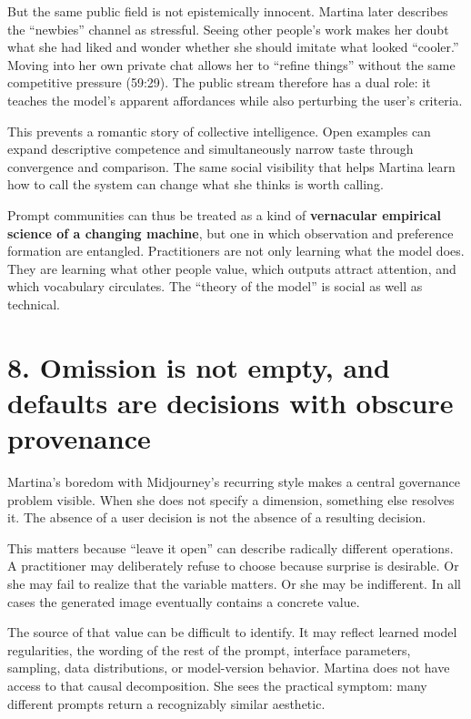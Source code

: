 \documentclass[
  11pt,
  letterpaper,
]{article}
\begin{document}
But the same public field is not epistemically innocent. Martina later
describes the ``newbies'' channel as stressful. Seeing other people's
work makes her doubt what she had liked and wonder whether she should
imitate what looked ``cooler.'' Moving into her own private chat allows
her to ``refine things'' without the same competitive pressure (59:29).
The public stream therefore has a dual role: it teaches the model's
apparent affordances while also perturbing the user's criteria.

This prevents a romantic story of collective intelligence. Open examples
can expand descriptive competence and simultaneously narrow taste
through convergence and comparison. The same social visibility that
helps Martina learn how to call the system can change what she thinks is
worth calling.

Prompt communities can thus be treated as a kind of \textbf{vernacular
empirical science of a changing machine}, but one in which observation
and preference formation are entangled. Practitioners are not only
learning what the model does. They are learning what other people value,
which outputs attract attention, and which vocabulary circulates. The
``theory of the model'' is social as well as technical.

\section{8. Omission is not empty, and defaults are decisions with
obscure
provenance}\label{omission-is-not-empty-and-defaults-are-decisions-with-obscure-provenance}

Martina's boredom with Midjourney's recurring style makes a central
governance problem visible. When she does not specify a dimension,
something else resolves it. The absence of a user decision is not the
absence of a resulting decision.

This matters because ``leave it open'' can describe radically different
operations. A practitioner may deliberately refuse to choose because
surprise is desirable. Or she may fail to realize that the variable
matters. Or she may be indifferent. In all cases the generated image
eventually contains a concrete value.

The source of that value can be difficult to identify. It may reflect
learned model regularities, the wording of the rest of the prompt,
interface parameters, sampling, data distributions, or model-version
behavior. Martina does not have access to that causal decomposition. She
sees the practical symptom: many different prompts return a recognizably
similar aesthetic.
\end{document}
